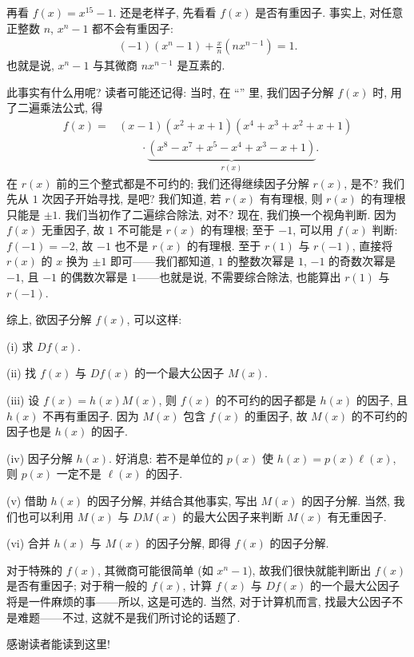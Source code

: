 \begin{example}
    再看 $f(x) = x^{15} - 1$. 还是老样子, 先看看 $f(x)$ 是否有重因子. 事实上, 对任意正整数 $n$, $x^n - 1$ 都不会有重因子:
    \begin{align*}
        (-1) (x^n - 1) + \frac{x}{n} (nx^{n-1}) = 1.
    \end{align*}
    也就是说, $x^n - 1$ 与其微商 $nx^{n-1}$ 是互素的.

    此事实有什么用呢? 读者可能还记得: 当时, 在 ``\FactorsOfHigherDegreeOfPolynomialsOverQ'' 里, 我们因子分解 $f(x)$ 时, 用了二遍乘法公式, 得
    \begin{align*}
        f(x)
        = {} & (x-1) (x^2+x+1) (x^4+x^3+x^2+x+1)                           \\
             & \qquad \cdot \underbrace{(x^8-x^7+x^5-x^4+x^3-x+1)}_{r(x)}.
    \end{align*}
    在 $r(x)$ 前的三个整式都是不可约的; 我们还得继续因子分解 $r(x)$, 是不? 我们先从 $1$ 次因子开始寻找, 是吧? 我们知道, 若 $r(x)$ 有有理根, 则 $r(x)$ 的有理根只能是 $\pm 1$. 我们当初作了二遍综合除法, 对不? 现在, 我们换一个视角判断. 因为 $f(x)$ 无重因子, 故 $1$ 不可能是 $r(x)$ 的有理根; 至于 $-1$, 可以用 $f(x)$ 判断: $f(-1) = -2$, 故 $-1$ 也不是 $r(x)$ 的有理根. 至于 $r(1)$ 与 $r(-1)$, 直接将 $r(x)$ 的 $x$ 换为 $\pm 1$ 即可——我们都知道, $1$ 的整数次幂是 $1$, $-1$ 的奇数次幂是 $-1$, 且 $-1$ 的偶数次幂是 $1$——也就是说, 不需要综合除法, 也能算出 $r(1)$ 与 $r(-1)$.
\end{example}

综上, 欲因子分解 $f(x)$, 可以这样:

(i) 求 $Df(x)$.

(ii) 找 $f(x)$ 与 $Df(x)$ 的一个最大公因子 $M(x)$.

(iii) 设 $f(x) = h(x) M(x)$, 则 $f(x)$ 的不可约的因子都是 $h(x)$ 的因子, 且 $h(x)$ 不再有重因子. 因为 $M(x)$ 包含 $f(x)$ 的重因子, 故 $M(x)$ 的不可约的因子也是 $h(x)$ 的因子.

(iv) 因子分解 $h(x)$. 好消息: 若不是单位的 $p(x)$ 使 $h(x) = p(x) \ell(x)$, 则 $p(x)$ 一定不是 $\ell (x)$ 的因子.

(v) 借助 $h(x)$ 的因子分解, 并结合其他事实, 写出 $M(x)$ 的因子分解. 当然, 我们也可以利用 $M(x)$ 与 $DM(x)$ 的最大公因子来判断 $M(x)$ 有无重因子.

(vi) 合并 $h(x)$ 与 $M(x)$ 的因子分解, 即得 $f(x)$ 的因子分解.

对于特殊的 $f(x)$, 其微商可能很简单 (如 $x^n - 1$), 故我们很快就能判断出 $f(x)$ 是否有重因子; 对于稍一般的 $f(x)$, 计算 $f(x)$ 与 $Df(x)$ 的一个最大公因子将是一件麻烦的事——所以, 这是可选的. 当然, 对于计算机而言, 找最大公因子不是难题——不过, 这就不是我们所讨论的话题了.

感谢读者能读到这里!
